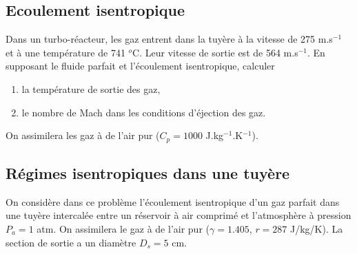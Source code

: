 \subsection{Ecoulement isentropique}

Dans un turbo-r\'eacteur, les gaz entrent dans la tuy\`ere \`a la vitesse
de 275 m.s$^{-1}$ et \`a une temp\'erature de 741 $^o$C.
Leur vitesse de sortie est de 564 m.s$^{-1}$.
En supposant le fluide parfait et l'\'ecoulement isentropique, calculer
\begin{enumerate}
\item
la temp\'erature de sortie des gaz,
\item
le nombre de Mach dans les conditions d'\'ejection des gaz.
\end{enumerate}
On assimilera les gaz \`a de l'air pur ($C_p = 1000$ J.kg$^{-1}$.K$^{-1}$).

\subsection{R\'egimes isentropiques dans une tuyère}

On consid\`ere dans ce probl\`eme l'\'ecoulement isentropique
d'un gaz parfait dans une tuy\`ere
intercal\'ee entre un r\'eservoir \`a air comprim\'e et l'atmosph\`ere
\`a pression $P_a = 1$ atm.
On assimilera le gaz \`a de l'air pur ($\gamma = 1.405$, 
$r=287$ J/kg/K).
La section de sortie a un diam\`etre $D_s = 5$ cm.

